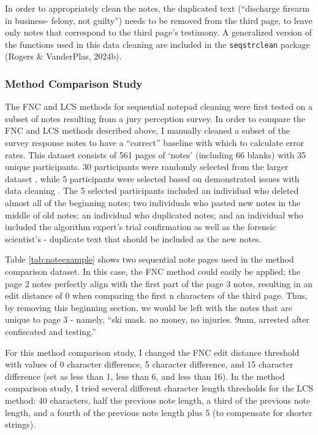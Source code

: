 \documentclass[print]{nuthesis}
\begin{document}
In order to appropriately clean the notes, the duplicated text (``discharge firearm in business- felony, not guilty'') needs to be removed from the third page, to leave only notes that correspond to the third page's testimony.
A generalized version of the functions used in this data cleaning are included in the \texttt{seqstrclean} package (Rogers \& VanderPlas, 2024b).

\hypertarget{method-comparison-study}{%
\subsubsection{Method Comparison Study}\label{method-comparison-study}}

The FNC and LCS methods for sequential notepad cleaning were first tested on a subset of notes resulting from a jury perception survey.
In order to compare the FNC and LCS methods described above, I manually cleaned a subset of the survey response notes to have a ``correct'' baseline with which to calculate error rates.
This dataset consists of 561 pages of `notes' (including 66 blanks) with 35 unique participants.
30 participants were randomly selected from the larger dataset , while 5 participants were selected based on demonstrated issues with  data cleaning .
The 5 selected participants included an individual who deleted almost all of the beginning notes; two individuals who pasted new notes in the middle of old notes; an individual who duplicated notes; and an individual who included the algorithm expert's trial confirmation as well as the forensic scientist's - duplicate text that should be included as the new notes.

Table \ref{tab:noteexample} shows two sequential note pages used in the method comparison dataset.
In this case, the FNC method could easily be applied; the page 2 notes perfectly align with the first part of the page 3 notes, resulting in an edit distance of 0 when comparing the first n characters of the third page.
Thus, by removing this beginning section, we would be left with the notes that are unique to page 3 - namely, ``ski mask. no money, no injuries. 9mm, arrested after confiscated and testing.''

For this method comparison study, I changed the FNC edit distance threshold with values of 0 character difference, 5 character difference, and 15 character difference (set as less than 1, less than 6, and less than 16).
In the method comparison study, I tried several different character length thresholds for the LCS method: 40 characters, half the previous note length, a third of the previous note length, and a fourth of the previous note length plus 5 (to compensate for shorter strings).
\end{document}
